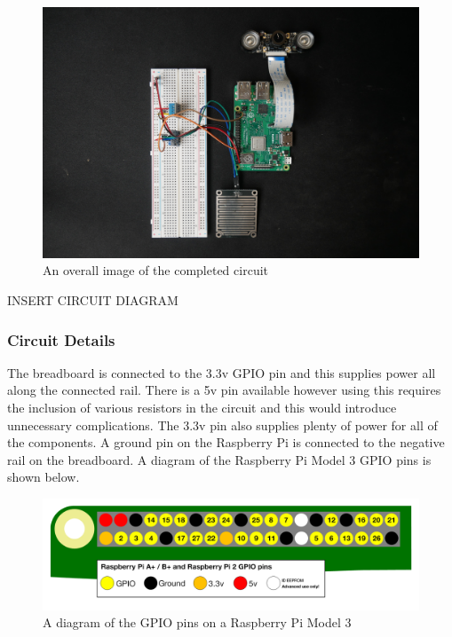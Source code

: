 \documentclass[10pt,a4paper]{article}
\begin{document}
\begin{figure}[H]
  \centering
    \includegraphics[width=\linewidth]{images/overView.jpg}
    \caption{An overall image of the completed circuit}
    \label{fig:overView}
\end{figure}

INSERT CIRCUIT DIAGRAM

\subsubsection{Circuit Details}
The breadboard is connected to the 3.3v GPIO pin and this supplies power all along the connected rail. There is a 5v pin available however using this requires the inclusion of various resistors in the circuit and this would introduce unnecessary complications. The 3.3v pin also supplies plenty of power for all of the components. A ground pin on the Raspberry Pi is connected to the negative rail on the breadboard. A diagram of the Raspberry Pi Model 3 GPIO pins is shown below. 
\begin{figure}[H]
  \centering
    \includegraphics[width=\linewidth]{images/gpio-pins.png}
    \caption{A diagram of the GPIO pins on a Raspberry Pi Model 3}
    \label{fig:gpiopins}
\end{figure}
\end{document}
